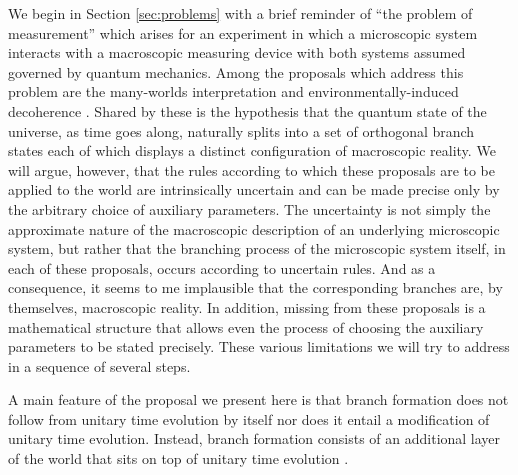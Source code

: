 \documentclass[12pt,amsmath,amssymb,onecolumn]{revtex4-2}
\begin{document}
We begin in Section \ref{sec:problems} with a brief reminder of ``the problem of measurement''
which arises for an experiment
in which a microscopic system interacts with a macroscopic measuring device 
with both systems assumed governed by quantum mechanics.
Among the proposals which address this problem
are the many-worlds interpretation \cite{Everett, DeWitt} and
environmentally-induced decoherence \cite{Zeh, Zurek, Zurek1, Zurek2, Wallace, Riedel}. 
Shared by these is the hypothesis that the quantum state of the universe,
as time goes along, naturally splits into a set of orthogonal branch states each of which displays
a distinct configuration of macroscopic reality.
We will argue, however, that the rules according to which these proposals 
are to be applied to the world are intrinsically uncertain
and can be made precise only by the arbitrary choice of auxiliary parameters.
The uncertainty is not simply the approximate nature of the macroscopic
description of an underlying microscopic system, but rather that
the branching process of the microscopic system itself, in each of these proposals, occurs
according to uncertain rules.
And as a consequence, it seems to me
implausible that the corresponding branches are, by themselves, macroscopic reality.
In addition, missing from these proposals is a mathematical structure
that allows even the process of choosing the auxiliary parameters to be stated precisely.
These various limitations we will try to address in a sequence of several steps.

A main feature of the proposal we present here
is that branch formation does not follow from unitary time
evolution by itself nor does it 
entail a modification of unitary time evolution.
Instead, branch formation consists of an additional layer
of the world that sits on top of unitary time evolution \cite{Weingarten}.
\end{document}

